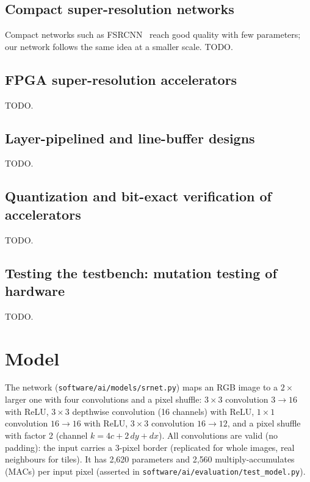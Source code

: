 \documentclass[conference]{IEEEtran}
\begin{document}
\subsection{Compact super-resolution networks}
Compact networks such as FSRCNN~\cite{dong2016fsrcnn} reach good quality with few parameters; our network follows the same idea at a smaller scale. TODO.
\subsection{FPGA super-resolution accelerators}
TODO.
\subsection{Layer-pipelined and line-buffer designs}
TODO.
\subsection{Quantization and bit-exact verification of accelerators}
TODO.
\subsection{Testing the testbench: mutation testing of hardware}
TODO.

\section{Model}\label{sec:model}
The network (\texttt{software/\allowbreak{}ai/\allowbreak{}models/\allowbreak{}srnet.py}) maps an RGB image to a $2\times$ larger one with four convolutions and a pixel shuffle:
$3\times3$ convolution $3\!\to\!16$ with ReLU, $3\times3$ depthwise convolution (16 channels) with ReLU, $1\times1$ convolution $16\!\to\!16$ with ReLU,
$3\times3$ convolution $16\!\to\!12$, and a pixel shuffle with factor 2 (channel $k=4c+2\,dy+dx$).
All convolutions are valid (no padding): the input carries a 3-pixel border (replicated for whole images, real neighbours for tiles).
It has 2{,}620 parameters and 2{,}560 multiply-accumulates (MACs) per input pixel (asserted in \texttt{software/\allowbreak{}ai/\allowbreak{}evaluation/\allowbreak{}test\_model.py}).
\end{document}
